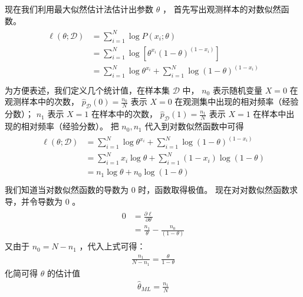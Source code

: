\documentclass[letterpaper,10pt,english]{sphinxmanual}
\begin{document}
现在我们利用最大似然估计法估计出参数 \(\theta\) ，
首先写出观测样本的对数似然函数。
\begin{align}\label{equation:最大似然估计/content:最大似然估计/content:7}\!\begin{aligned}
\ell(\theta;\mathcal{D}) &= \sum_{i=1}^N \log P(x_i;\theta)\\
& = \sum_{i=1}^N \log [ \theta^{x_i} (1-\theta)^{(1-x_i)} ]\\
& = \sum_{i=1}^N \log \theta^{x_i}  +  \sum_{i=1}^N \log (1-\theta)^{(1-x_i)}\\
\end{aligned}\end{align}
为方便表述，我们定义几个统计值，在样本集 \(\mathcal{D}\) 中，
\(n_0\) 表示随机变量 \(X=0\) 在观测样本中的次数，
\(\hat{p}_{\mathcal{D}}(0)=\frac{n_0}{N}\) 表示 \(X=0\)
在观测集中出现的相对频率（经验分数）；
\(n_1\) 表示 \(X=1\) 在样本中的次数，
\(\hat{p}_{\mathcal{D}}(1)=\frac{n_1}{N}\)
表示 \(X=1\) 在样本中出现的相对频率（经验分数）。
把 \(n_0,n_1\) 代入到对数似然函数中可得
\begin{align}\label{equation:最大似然估计/content:最大似然估计/content:8}\!\begin{aligned}
\ell(\theta;\mathcal{D}) &=  \sum_{i=1}^N \log  \theta^{x_i}  +  \sum_{i=1}^N \log (1-\theta)^{(1-x_i)}\\
&= \sum_{i=1}^N x_i \log \theta +  \sum_{i=1}^N (1-x_i) \log (1-\theta)\\
&= n_1 \log \theta + n_0 \log (1-\theta)\\
\end{aligned}\end{align}
我们知道当对数似然函数的导数为 \(0\) 时，函数取得极值。
现在对对数似然函数求导，并令导数为 \(0\) 。
\begin{equation}\label{equation:最大似然估计/content:最大似然估计/content:9}
\begin{split}\begin{aligned} 0 &=\frac{\partial \ell}{\partial \theta} \\
 &= \frac{n_1}{\theta}- \frac{n_0}{(1-\theta)} \end{aligned}\end{split}
\end{equation}
又由于 \(n_0 = N - n_1\) ，代入上式可得：
\begin{equation}\label{equation:最大似然估计/content:最大似然估计/content:10}
\begin{split}\frac{n_1}{N-n_1}=\frac{\theta}{1-\theta}\end{split}
\end{equation}
化简可得 \(\theta\) 的估计值
\begin{equation}\label{equation:最大似然估计/content:最大似然估计/content:11}
\begin{split}\hat{\theta}_{M L}=\frac{n_1}{N}\end{split}
\end{equation}
\end{document}
